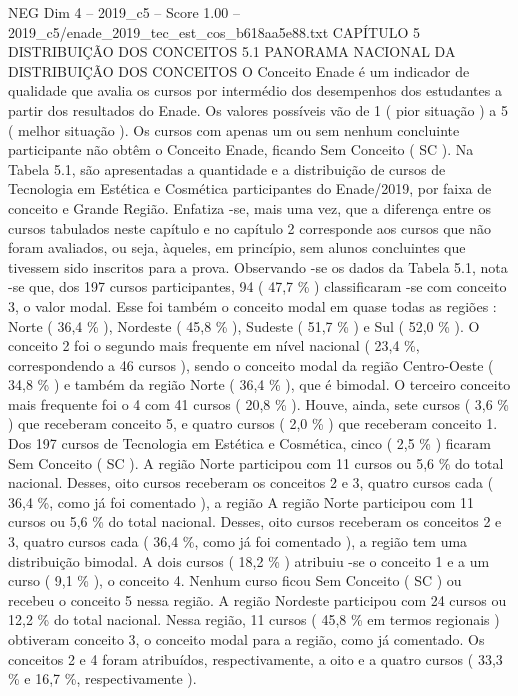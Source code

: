 \begin{textsample}{NEG Dim 4 – 2019\_c5 – Score 1.00 – 2019\_c5/enade\_2019\_tec\_est\_cos\_b618aa5e88.txt}  \label{ex:f4_neg_166}
CAPÍTULO 5 DISTRIBUIÇÃO DOS CONCEITOS 5.1 PANORAMA NACIONAL DA DISTRIBUIÇÃO DOS CONCEITOS O Conceito Enade é um indicador de qualidade que avalia os cursos por intermédio dos desempenhos dos estudantes a partir dos resultados do Enade.
Os valores possíveis vão de 1 ( pior situação ) a 5 ( melhor situação ).
Os cursos com apenas um ou sem nenhum concluinte participante não obtêm o Conceito Enade, ficando Sem Conceito ( SC ).
Na Tabela 5.1, são apresentadas a quantidade e a distribuição de cursos de Tecnologia em Estética e Cosmética participantes do Enade/2019, por faixa de conceito e Grande Região.
Enfatiza -se, mais uma vez, que a diferença entre os cursos tabulados neste capítulo e no capítulo 2 corresponde aos cursos que não foram avaliados, ou seja, àqueles, em princípio, sem alunos concluintes que tivessem sido inscritos para a prova.
Observando -se os dados da Tabela 5.1, nota -se que, dos 197 cursos participantes, 94 ( 47,7 \% ) classificaram -se com conceito 3, o valor modal.
Esse foi também o conceito modal em quase todas as regiões : Norte ( 36,4 \% ), Nordeste ( 45,8 \% ), Sudeste ( 51,7 \% ) e Sul ( 52,0 \% ).
O conceito 2 foi o segundo mais frequente em nível nacional ( 23,4 \%, correspondendo a 46 cursos ), sendo o conceito modal da região Centro-Oeste ( 34,8 \% ) e também da região Norte ( 36,4 \% ), que é bimodal.
O terceiro conceito mais frequente foi o 4 com 41 cursos ( 20,8 \% ).
Houve, ainda, sete cursos ( 3,6 \% ) que receberam conceito 5, e quatro cursos ( 2,0 \% ) que receberam conceito 1.
Dos 197 cursos de Tecnologia em Estética e Cosmética, cinco ( 2,5 \% ) ficaram Sem Conceito ( SC ).
A região Norte participou com 11 cursos ou 5,6 \% do total nacional.
Desses, oito cursos receberam os conceitos 2 e 3, quatro cursos cada ( 36,4 \%, como já foi comentado ), a região A região Norte participou com 11 cursos ou 5,6 \% do total nacional.
Desses, oito cursos receberam os conceitos 2 e 3, quatro cursos cada ( 36,4 \%, como já foi comentado ), a região tem uma distribuição bimodal.
A dois cursos ( 18,2 \% ) atribuiu -se o conceito 1 e a um curso ( 9,1 \% ), o conceito 4.
Nenhum curso ficou Sem Conceito ( SC ) ou recebeu o conceito 5 nessa região.
A região Nordeste participou com 24 cursos ou 12,2 \% do total nacional.
Nessa região, 11 cursos ( 45,8 \% em termos regionais ) obtiveram conceito 3, o conceito modal para a região, como já comentado.
Os conceitos 2 e 4 foram atribuídos, respectivamente, a oito e a quatro cursos ( 33,3 \% e 16,7 \%, respectivamente ).

\end{textsample}
